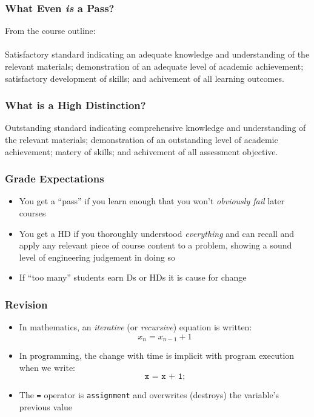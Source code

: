 \documentclass[14pt]{beamer}
\begin{document}
\begin{frame}
\frametitle{What Even \textit{is} a Pass?}
From the course outline: \\
~\\
Satisfactory standard indicating an adequate knowledge and understanding of the relevant materials; demonstration of an adequate level of academic achievement; satisfactory development of skills; and achivement of all learning outcomes.
\end{frame}

\begin{frame}
\frametitle{What is a High Distinction?}

Outstanding standard indicating comprehensive knowledge and understanding of the relevant materials; demonstration of an outstanding level of academic achievement; matery of skills; and achivement of all assessment objective.
\end{frame}

\begin{frame}
\frametitle{Grade Expectations}
\begin{itemize}
\item You get a ``pass'' if you learn enough that you won't \textit{obviously fail} later courses
\item You get a HD if you thoroughly understood \textit{everything} and can recall and apply any relevant piece of course content to a problem, showing a sound level of engineering judgement in doing so
\item If ``too many'' students earn Ds or HDs it is cause for change
\end{itemize}
\end{frame}

\begin{frame}
\frametitle{Revision}
\begin{itemize}
\item In mathematics, an \textit{iterative} (or \textit{recursive}) equation is written:
\begin{equation}
x_n = x_{n-1} + 1
\end{equation}
\item In programming, the change with time is implicit with program execution when we write:\\
\begin{equation}
\texttt{x = x + 1;}
\end{equation}
\item The \texttt{=} operator is \texttt{assignment} and overwrites (destroys) the variable's previous value
\end{itemize}
\end{frame}
\end{document}
